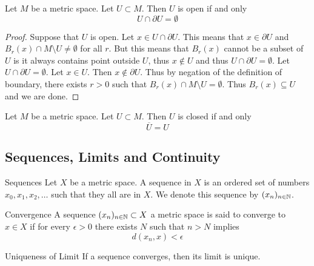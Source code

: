 \documentclass[a4paper]{article}
\begin{document}
\begin{prp}{}{} Let $M$ be a metric space. Let $U\subset M$. Then $U$ is open if and only $$U\cap\partial U=\emptyset$$ \tcbline
\begin{proof}
Suppose that $U$ is open. Let $x\in U\cap\partial U$. This means that $x\in\partial U$ and $B_r(x)\cap M\setminus U\neq\emptyset$ for all $r$. But this means that $B_r(x)$ cannot be a subset of $U$ is it always contains point outside $U$, thus $x\notin U$ and thus $U\cap\partial U=\emptyset$. \linebreak\linebreak
Let $U\cap\partial U=\emptyset$. Let $x\in U$. Then $x\notin\partial U$. Thus by negation of the definition of boundary, there exists $r>0$ such that $B_r(x)\cap M\setminus U=\emptyset$. Thus $B_r(x)\subseteq U$ and we are done. 
\end{proof}
\end{prp}

\begin{prp}{}{} Let $M$ be a metric space. Let $U\subset M$. Then $U$ is closed if and only $$\overline{U}=U$$
\end{prp}

\subsection{Sequences, Limits and Continuity}
\begin{defn}{Sequences}{} Let $X$ be a metric space. A sequence in $X$ is an ordered set of numbers $x_0,x_1,x_2,\dots$ such that they all are in $X$. We denote this sequence by $(x_n)_{n\in\mathbb{N}}$. 
\end{defn}

\begin{defn}{Convergence}{} A sequence $(x_n)_{n\in\mathbb{N}}\subset X$ a metric space is said to converge to $x\in X$ if for every $\epsilon>0$ there exists $N$ such that $n>N$ implies $$d(x_n,x)<\epsilon$$
\end{defn}

\begin{prp}{Uniqueness of Limit}{} If a sequence converges, then its limit is unique. 
\end{prp}
\end{document}
